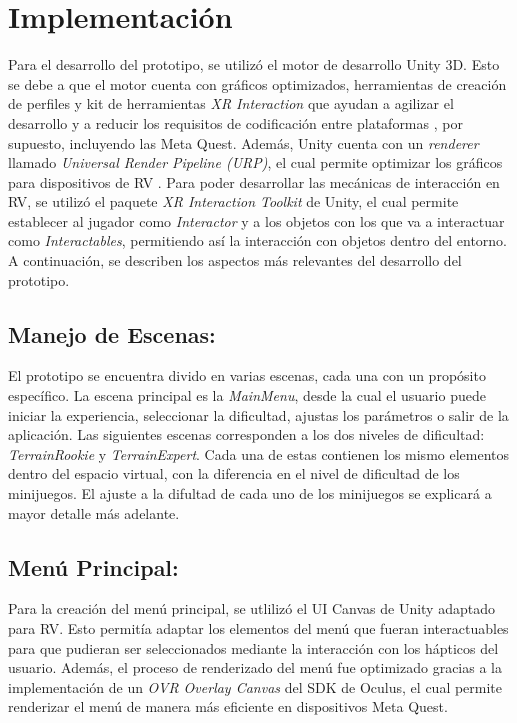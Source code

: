 \chapter{Implementación} \label{sec:implementacion}

Para el desarrollo del prototipo, se utilizó el motor de desarrollo Unity 3D. Esto se debe a que el motor cuenta con gráficos optimizados, 
herramientas de creación de perfiles y kit de herramientas \textit{XR Interaction} que ayudan a agilizar el desarrollo y a reducir los requisitos de 
codificación entre plataformas \cite{unityxr}, por supuesto, incluyendo las Meta Quest. Además, Unity cuenta con un \textit{renderer} llamado \textit{Universal Render Pipeline (URP)}, 
el cual permite optimizar los gráficos para dispositivos de RV \cite{unityxr}. Para poder desarrollar las mecánicas de interacción en RV, se utilizó el paquete \textit{XR Interaction Toolkit} de Unity,
el cual permite establecer al jugador como \textit{Interactor} y a los objetos con los que va a interactuar como \textit{Interactables}, permitiendo así la interacción con objetos dentro del entorno.
A continuación, se describen los aspectos más relevantes del desarrollo del prototipo.

\section{Manejo de Escenas:}

El prototipo se encuentra divido en varias escenas, cada una con un propósito específico. La escena principal es la \textit{MainMenu}, desde la cual el usuario puede iniciar la experiencia, seleccionar la dificultad, ajustas los parámetros o salir de la aplicación. 
Las siguientes escenas corresponden a los dos niveles de dificultad: \textit{TerrainRookie} y \textit{TerrainExpert}. Cada una de estas contienen los mismo elementos dentro del espacio virtual, con la diferencia en el nivel de dificultad de los minijuegos.
El ajuste a la difultad de cada uno de los minijuegos se explicará a mayor detalle más adelante.

\section{Menú Principal:}

Para la creación del menú principal, se utlilizó el UI Canvas de Unity adaptado para RV. Esto permitía adaptar los elementos del menú que fueran interactuables
para que pudieran ser seleccionados mediante la interacción con los hápticos del usuario. Además, el proceso de renderizado del menú fue optimizado gracias a la 
implementación de un \textit{OVR Overlay Canvas} del SDK de Oculus, el cual permite renderizar el menú de manera más eficiente en dispositivos Meta Quest.

